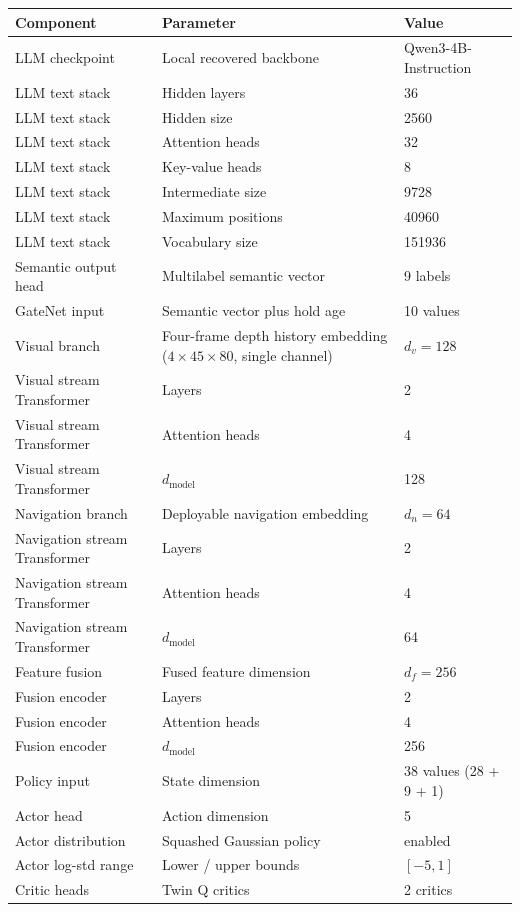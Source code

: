 \documentclass[11pt]{article}
\begin{document}
\begin{center}
\footnotesize
\begin{tabular*}{\textwidth}{@{\extracolsep{\fill}}L{0.34\textwidth}L{0.38\textwidth}L{0.20\textwidth}@{}}
\toprule
Component & Parameter & Value \\
\midrule
LLM checkpoint & Local recovered backbone & Qwen3-4B-Instruction \\
LLM text stack & Hidden layers & 36 \\
LLM text stack & Hidden size & 2560 \\
LLM text stack & Attention heads & 32 \\
LLM text stack & Key-value heads & 8 \\
LLM text stack & Intermediate size & 9728 \\
LLM text stack & Maximum positions & 40960 \\
LLM text stack & Vocabulary size & 151936 \\
Semantic output head & Multilabel semantic vector & 9 labels \\
GateNet input & Semantic vector plus hold age & 10 values \\
Visual branch & Four-frame depth history embedding ($4\times45\times80$, single channel) & $d_v=128$ \\
Visual stream Transformer & Layers & 2 \\
Visual stream Transformer & Attention heads & 4 \\
Visual stream Transformer & $d_{\mathrm{model}}$ & 128 \\
Navigation branch & Deployable navigation embedding & $d_n=64$ \\
Navigation stream Transformer & Layers & 2 \\
Navigation stream Transformer & Attention heads & 4 \\
Navigation stream Transformer & $d_{\mathrm{model}}$ & 64 \\
Feature fusion & Fused feature dimension & $d_f=256$ \\
Fusion encoder & Layers & 2 \\
Fusion encoder & Attention heads & 4 \\
Fusion encoder & $d_{\mathrm{model}}$ & 256 \\
Policy input & State dimension & 38 values (28 + 9 + 1) \\
Actor head & Action dimension & 5 \\
Actor distribution & Squashed Gaussian policy & enabled \\
Actor log-std range & Lower / upper bounds & $[-5,1]$ \\
Critic heads & Twin Q critics & 2 critics \\
\bottomrule
\end{tabular*}
\end{center}
\end{document}

